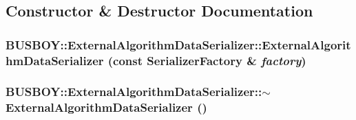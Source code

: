 \subsection{Constructor \& Destructor Documentation}
\hypertarget{classBUSBOY_1_1ExternalAlgorithmDataSerializer_aba63d48d306c9b4c01deb7bbeb3f2895}{
\subsubsection[{ExternalAlgorithmDataSerializer}]{\setlength{\rightskip}{0pt plus 5cm}BUSBOY::ExternalAlgorithmDataSerializer::ExternalAlgorithmDataSerializer (const {\bf SerializerFactory} \& {\em factory})}}
\label{classBUSBOY_1_1ExternalAlgorithmDataSerializer_aba63d48d306c9b4c01deb7bbeb3f2895}
\hypertarget{classBUSBOY_1_1ExternalAlgorithmDataSerializer_aae0a099bb0ce545c1f2d1bd74b710055}{
\subsubsection[{$\sim$ExternalAlgorithmDataSerializer}]{\setlength{\rightskip}{0pt plus 5cm}BUSBOY::ExternalAlgorithmDataSerializer::$\sim$ExternalAlgorithmDataSerializer ()}}
\label{classBUSBOY_1_1ExternalAlgorithmDataSerializer_aae0a099bb0ce545c1f2d1bd74b710055}


